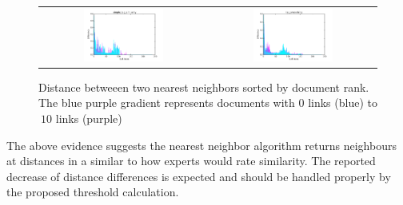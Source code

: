 \begin{figure}[h!]
\begin{tabular}{cc}
\includegraphics[width =0.5\textwidth]{images/thresh_cosine_simple_tag_similarity_distances} 	& \includegraphics[width =0.5\textwidth]{images/thresh_cosine_tag_smoothing_distances}
\end{tabular}
\caption{Distance betweeen two nearest neighbors sorted by document rank. The blue purple gradient represents documents with 0 links (blue) to $\>10$ links (purple)}
\label{fig:thresholds_differences}
\end{figure}

The above evidence suggests the nearest neighbor algorithm returns neighbours 
at distances in a similar to how experts would rate similarity. The reported decrease
of distance differences is expected and should be handled properly by the proposed
threshold calculation.


